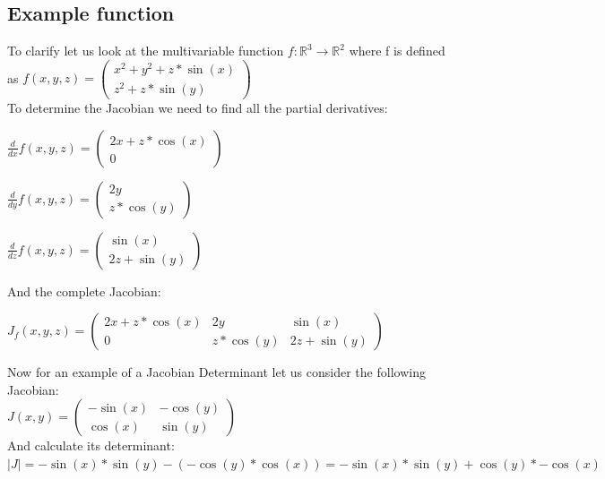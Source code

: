 \documentclass[journal]{IEEEtran}
\begin{document}
\subsection{Example function}
To clarify let us look at the multivariable function $f: \mathbb{R}^3 \rightarrow \mathbb{R}^2$ where f is defined as
$f(x, y, z) = \begin{pmatrix}x^2 + y^2 + z * \sin(x)\\z^2 + z * \sin(y)\end{pmatrix}$\\
To determine the Jacobian we need to find all the partial derivatives:\\
\begin{center} $\frac{d}{dx} f(x, y, z) = \begin{pmatrix}2x + z * \cos(x)\\0\end{pmatrix}$ \end{center}
\begin{center} $\frac{d}{dy} f(x, y, z) = \begin{pmatrix}2y\\z * \cos(y)\end{pmatrix}$ \end{center}
\begin{center} $\frac{d}{dz} f(x, y, z) = \begin{pmatrix}\sin(x)\\2z + \sin(y)\end{pmatrix}$ \end{center}
And the complete Jacobian:\\
\begin{center} $J_f(x, y, z) =
\begin{pmatrix}
  2x + z * \cos(x) & 2y & \sin(x)\\
  0 & z * \cos(y) & 2z + \sin(y)
\end{pmatrix}$\end{center}

Now for an example of a Jacobian Determinant let us consider the following Jacobian:\\
$J(x, y) = \begin{pmatrix}
  -\sin(x) & -\cos(y)\\
  \cos(x) & \sin(y)
\end{pmatrix}$\\
And calculate its determinant:\\
$|J| = -\sin(x) * \sin(y) - (-\cos(y) * \cos(x)) = -\sin(x) * \sin(y) + \cos(y) * -\cos(x)$
\end{document}
